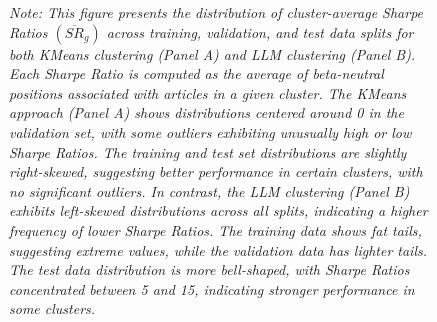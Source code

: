 \begin{figure}[htbp]
\vspace{0.5cm}
\begin{minipage}{\textwidth}
\setlength{\parindent}{0pt}
{\footnotesize\textit{Note:
This figure presents the distribution of cluster-average Sharpe Ratios $(\overline{SR}_g)$ across training, validation, and test data splits for both KMeans clustering (Panel A) and LLM clustering (Panel B). Each Sharpe Ratio is computed as the average of beta-neutral positions associated with articles in a given cluster. The KMeans approach (Panel A) shows distributions centered around 0 in the validation set, with some outliers exhibiting unusually high or low Sharpe Ratios. The training and test set distributions are slightly right-skewed, suggesting better performance in certain clusters, with no significant outliers. In contrast, the LLM clustering (Panel B) exhibits left-skewed distributions across all splits, indicating a higher frequency of lower Sharpe Ratios. The training data shows fat tails, suggesting extreme values, while the validation data has lighter tails. The test data distribution is more bell-shaped, with Sharpe Ratios concentrated between 5 and 15, indicating stronger performance in some clusters.
}}
\end{minipage}
\end{figure}
